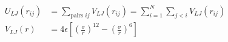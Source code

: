 \documentclass[preview]{standalone}
\begin{document}
\begin{align*}
U_{LJ}(r_{ij}) &= \sum_{\text{pairs }i j} V_{LJ}(r_{ij})
            = \sum_{i=1}^N \sum_{j<i} V_{LJ}(r_{ij}) \\
            V_{LJ}(r) &= 4\epsilon \left[
            \left(\frac{\sigma}{r}\right)^{12}
            - \left(\frac{\sigma}{r}\right)^{6}
            \right]
\end{align*}
\end{document}
